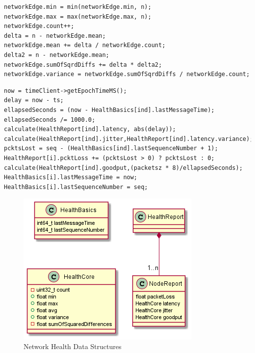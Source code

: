 \documentclass[letterpaper,twocolumn,12pt]{article}
\begin{document}
\begin{lstlisting}[caption={calculate\_health(HealthCore \&networkEdge, n)}, label=code:calc, float=t]
networkEdge.min = min(networkEdge.min, n);
networkEdge.max = max(networkEdge.max, n);
networkEdge.count++;
delta = n - networkEdge.mean;
networkEdge.mean += delta / networkEdge.count;
delta2 = n - networkEdge.mean;
networkEdge.sumOfSqrdDiffs += delta * delta2;
networkEdge.variance = networkEdge.sumOfSqrdDiffs / networkEdge.count;
\end{lstlisting}

\begin{lstlisting}[caption={update\_health(ind, packetsz, ts, seq)},label=code:update, float=t] 
now = timeClient->getEpochTimeMS();
delay = now - ts;
ellapsedSeconds = (now - HealthBasics[ind].lastMessageTime);
ellapsedSeconds /= 1000.0;
calculate(HealthReport[ind].latency, abs(delay));
calculate(HealthReport[ind].jitter,HealthReport[ind].latency.variance);
pcktsLost = seq - (HealthBasics[ind].lastSequenceNumber + 1);
HealthReport[i].pcktLoss += (pcktsLost > 0) ? pcktsLost : 0;
calculate(HealthReport[ind].goodput,(packetsz * 8)/ellapsedSeconds);
HealthBasics[i].lastMessageTime = now;
HealthBasics[i].lastSequenceNumber = seq;
\end{lstlisting}

\begin{figure}[]
    \centering
    \includegraphics[width=\linewidth]{out/images/network_health/network_health.png}
    \caption{Network Health Data Structures}
    \label{fig:network_health_ds}
\end{figure}
\end{document}
